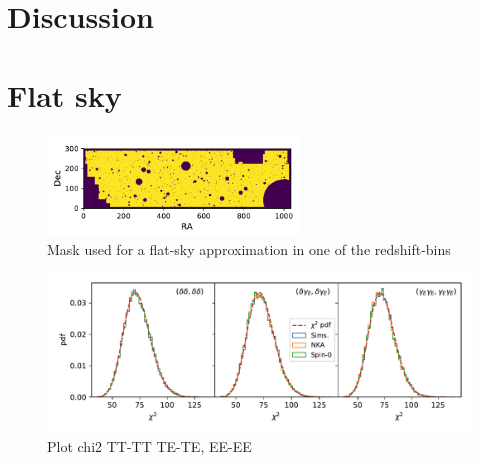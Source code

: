 \documentclass[a4paper,11pt]{article}
\begin{document}


\section{Discussion}\label{sec:discussion}

\appendix
\section{Flat sky}
\begin{figure}[htb]
  \centering
  \includegraphics[width=0.6\textwidth]{./figures/mask-lss_flat1.pdf}
  \caption{Mask used for a flat-sky approximation in one of the redshift-bins}
  \label{fig:mask_flat}
\end{figure}

\begin{figure}[htb]
  \centering
  \includegraphics[width=\textwidth]{./figures/run_chi2_TT_TE_EE.pdf}
  \caption{Plot chi2 TT-TT TE-TE, EE-EE}
  \label{fig:chi2_1bin_flat}
\end{figure}
\end{document}
